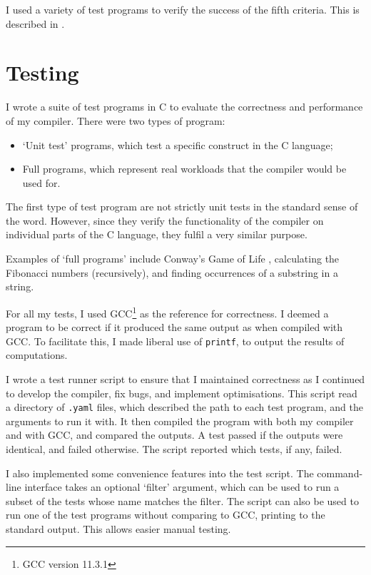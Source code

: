 \documentclass[00-main.tex]{subfiles}
\begin{document}
I used a variety of test programs to verify the success of the fifth criteria. This is described in .


\section{Testing} \label{sec:eval:testing}

I wrote a suite of test programs in C to evaluate the correctness and performance of my compiler.
There were two types of program:
\begin{itemize}
\item `Unit test' programs, which test a specific construct in the C language;
\item Full programs, which represent real workloads that the compiler would be used for.
\end{itemize}

The first type of test program are not strictly unit tests in the standard sense of the word. However, since they verify the functionality of the compiler on individual parts of the C language, they fulfil a very similar purpose.

Examples of `full programs' include Conway's Game of Life \cite{conways-game-of-life}, calculating the Fibonacci numbers (recursively), and finding occurrences of a substring in a string.

For all my tests, I used GCC\footnote{GCC version 11.3.1} as the reference for correctness.
I deemed a program to be correct if it produced the same output as when compiled with GCC.
To facilitate this, I made liberal use of \texttt{printf}, to output the results of computations.

I wrote a test runner script to ensure that I maintained correctness as I continued to develop the compiler, fix bugs, and implement optimisations.
This script read a directory of \texttt{.yaml} files, which described the path to each test program, and the arguments to run it with.
It then compiled the program with both my compiler and with GCC, and compared the outputs.
A test passed if the outputs were identical, and failed otherwise.
The script reported which tests, if any, failed.

I also implemented some convenience features into the test script.
The command-line interface takes an optional `filter' argument, which can be used to run a subset of the tests whose name matches the filter.
The script can also be used to run one of the test programs without comparing to GCC, printing to the standard output. This allows easier manual testing.
\end{document}

